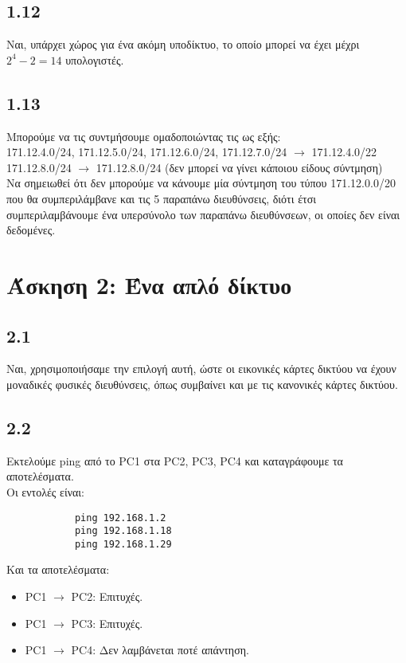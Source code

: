 \documentclass[a4paper, 12pt]{article}
\begin{document}
	\subsection*{1.12}
		Ναι, υπάρχει χώρος για ένα ακόμη υποδίκτυο, το οποίο μπορεί να έχει μέχρι $2^4-2=14$ υπολογιστές. 

	\subsection*{1.13} 
		Μπορούμε να τις συντμήσουμε ομαδοποιώντας τις ως εξής: \\
		
		171.12.4.0/24, 171.12.5.0/24, 171.12.6.0/24, 171.12.7.0/24 $\rightarrow$ 171.12.4.0/22 \\
		
		171.12.8.0/24 $\rightarrow$ 171.12.8.0/24 (δεν μπορεί να γίνει κάποιου είδους σύντμηση)\\ 
		
		Να σημειωθεί ότι δεν μπορούμε να κάνουμε μία σύντμηση του τύπου 171.12.0.0/20 που θα συμπεριλάμβανε και τις 5 παραπάνω διευθύνσεις, διότι έτσι συμπεριλαμβάνουμε ένα υπερσύνολο των παραπάνω διευθύνσεων, οι οποίες δεν είναι δεδομένες.
		
\section*{Άσκηση 2: Ένα απλό δίκτυο}

	\subsection*{2.1}
		Ναι, χρησιμοποιήσαμε την επιλογή αυτή, ώστε οι εικονικές κάρτες δικτύου να έχουν μοναδικές φυσικές διευθύνσεις, όπως συμβαίνει και με τις κανονικές κάρτες δικτύου.

	\subsection*{2.2}
		Εκτελούμε ping από το PC1 στα PC2, PC3, PC4 και καταγράφουμε τα αποτελέσματα. \\
		
		Οι εντολές είναι: 
		
		\begin{verbatim}
			ping 192.168.1.2
			ping 192.168.1.18
			ping 192.168.1.29
		\end{verbatim}
		
		Και τα αποτελέσματα:
		
		\begin{itemize}
			\item PC1 $\rightarrow$ PC2: Επιτυχές.
			\item PC1 $\rightarrow$ PC3: Επιτυχές.
			\item PC1 $\rightarrow$ PC4: Δεν λαμβάνεται ποτέ απάντηση.
		\end{itemize}
\end{document}
